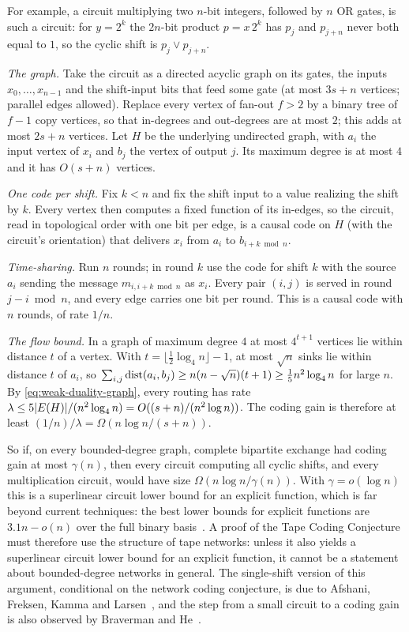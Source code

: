 For example, a circuit multiplying two $n$-bit integers, followed by $n$ OR gates, is such a circuit:
for $y=2^k$ the $2n$-bit product $p=x\,2^k$ has $p_j$ and $p_{j+n}$ never both equal to $1$, so the
cyclic shift is $p_j\vee p_{j+n}$.

\begin{informalproof}
\emph{The graph.} Take the circuit as a directed acyclic graph on its gates, the inputs $x_0,\dots,x_{n-1}$ and the shift-input bits that feed some gate (at most $3s+n$ vertices; parallel edges allowed). Replace
every vertex of fan-out $f>2$ by a binary tree of $f-1$ copy vertices, so that in-degrees and
out-degrees are at most $2$; this adds at most $2s+n$ vertices. Let $H$ be the underlying undirected
graph, with $a_i$ the input vertex of $x_i$ and $b_j$ the vertex of output $j$. Its maximum degree is
at most $4$ and it has $O(s+n)$ vertices.

\emph{One code per shift.} Fix $k<n$ and fix the shift input to a value realizing the shift by $k$.
Every vertex then computes a fixed function of its in-edges, so the circuit, read in topological order
with one bit per edge, is a causal code on $H$ (with the circuit's orientation) that delivers $x_i$ from
$a_i$ to $b_{i+k\bmod n}$.

\emph{Time-sharing.} Run $n$ rounds; in round $k$ use the code for shift $k$ with the source $a_i$ sending
the message $m_{i,i+k\bmod n}$ as $x_i$. Every pair $(i,j)$ is served in round $j-i\bmod n$, and every edge
carries one bit per round. This is a causal code with $n$ rounds, of rate $1/n$.

\emph{The flow bound.} In a graph of maximum degree $4$ at most $4^{t+1}$ vertices lie within distance $t$
of a vertex. With $t=\lfloor\tfrac12\log_4n\rfloor-1$, at most $\sqrt n$ sinks lie within distance $t$ of
$a_i$, so
$\sum_{i,j}\operatorname{dist}(a_i,b_j)\ge n(n-\sqrt n)(t+1)\ge\tfrac15n^2\log_4n$ for large $n$. By
\eqref{eq:weak-duality-graph}, every routing has rate $\lambda\le5\lvert E(H) \rvert/(n^2\log_4n)=O((s+n)/(n^2\log n))$.
The coding gain is therefore at least $(1/n)/\lambda=\Omega(n\log n/(s+n))$.
\end{informalproof}

So if, on every bounded-degree graph, complete bipartite exchange had coding gain at most $\gamma(n)$,
then every circuit computing all cyclic shifts, and every multiplication circuit, would have size
$\Omega(n\log n/\gamma(n))$. With $\gamma=o(\log n)$ this is a superlinear circuit lower bound for an
explicit function, which is far beyond current techniques: the best lower bounds for explicit functions
are $3.1n-o(n)$ over the full binary basis~\cite{LiYang2022}. A proof of the Tape Coding Conjecture must
therefore use the structure of tape networks: unless it also yields a superlinear circuit lower bound for an
explicit function, it cannot be a statement about bounded-degree networks in general. The single-shift version of this argument, conditional on the network coding conjecture, is due
to Afshani, Freksen, Kamma and Larsen~\cite{AFKL2019}, and the step from a small circuit to a coding gain
is also observed by Braverman and He~\cite{BravermanHe2026}.

